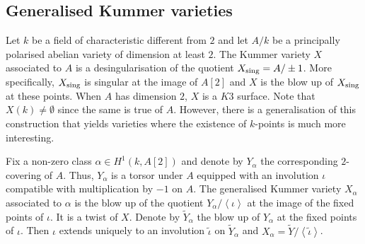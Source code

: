 \documentclass[10pt]{amsart}
\numberwithin{equation}{section}
\theoremstyle{remark}
\theoremstyle{definition}
\newtheorem{example}[equation]{Example}
\theoremstyle{definition}
\theoremstyle{definition}
\theoremstyle{definition}
\theoremstyle{definition}
\theoremstyle{definition}
\theoremstyle{definition}
\theoremstyle{definition}
\begin{document}
\subsection{Generalised Kummer varieties} Let $k$ be a field of characteristic different from $2$ and let $A/k$ be a principally polarised abelian variety of dimension at least $2$. The Kummer variety $X$ associated to $A$ is a  desingularisation of the quotient $X_\textup{sing}=A/\pm 1$. More specifically, $X_\textup{sing}$ is singular at the image of $A[2]$ and  $X$ is the blow up of $X_\textup{sing}$ at these points. When $A$ has dimension $2$, $X$ is a $K3$ surface. Note that $X(k)\neq \emptyset$ since the same is true of $A$. However, there is a generalisation of this construction that yields varieties where the existence of $k$-points is much more interesting. 

Fix a non-zero class $\alpha \in H^1(k,A[2])$ and denote by $Y_\alpha$ the corresponding $2$-covering of $A$. Thus, $Y_\alpha$ is a torsor under $A$ equipped with an involution $\iota$ compatible with multiplication by $-1$ on $A$. The generalised Kummer variety $X_\alpha$ associated to $\alpha$ is the blow up of the quotient $Y_\alpha/\left \langle \iota\right \rangle$ at the image of the fixed points of $\iota$. It is a twist of $X$. Denote by $\widetilde{Y}_\alpha$ the blow up of $Y_\alpha$ at the fixed points of $\iota$. Then $\iota$ extends uniquely to an involution $\widetilde{\iota}$ on  $\widetilde{Y}_\alpha$  and  $X_\alpha=\widetilde{Y}/\left \langle\widetilde{\iota}\right \rangle$. 
\end{document}
